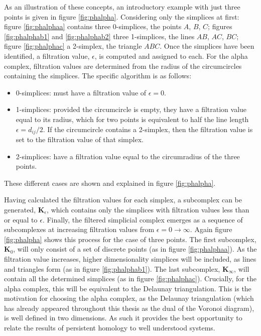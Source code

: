 As an illustration of these concepts, an introductory example with just three points is given in figure \ref{fig:phalpha}.
Considering only the simplices at first: figure \ref{fig:phalphaa} contains three 0\--simplices, the points $A$, $B$, $C$; figures \ref{fig:phalphab1} and \ref{fig:phalphab2} three 1\--simplices, the lines $AB$, $AC$, $BC$; figure \ref{fig:phalphac} a 2\--simplex, the triangle $ABC$.
Once the simplices have been identified, a filtration value, $\epsilon$, is computed and assigned to each.
For the alpha complex, filtration values are determined from the radius of the circumcircles containing the simplices.
The specific algorithm is as follows:
\begin{itemize}
	\item 0\--simplices: must have a filtration value of $\epsilon=0$.
	\item 1\--simplices: provided the circumcircle is empty, they have a filtration value equal to its radius, which for two points is equivalent to half the line length $\epsilon=d_{ij}/2$.
	If the circumcircle contains a 2\--simplex, then the filtration value is set to the filtration value of that simplex.
	\item 2\--simplices: have a filtration value equal to the circumradius of the three points.
\end{itemize}
These different cases are shown and explained in figure \ref{fig:phalpha}.

Having calculated the filtration values for each simplex, a subcomplex can be generated, $\mathbf{K}_\epsilon$, which contains only the simplices with filtration values less than or equal to $\epsilon$.
Finally, the filtered simplicial complex emerges as a sequence of subcomplexes at increasing filtration values from $\epsilon=0\rightarrow \infty$.
Again figure \ref{fig:phalpha} shows this process for the case of three points.
The first subcomplex, $\mathbf{K}_0$, will only consist of a set of discrete points (as in figure \ref{fig:phalphaa}).
As the filtration value increases, higher dimensionality simplices will be included, as lines and triangles form (as in figure \ref{fig:phalphab1}).
The last subcomplex, $\mathbf{K}_\infty$, will contain all the determined simplices (as in figure \ref{fig:phalphac}).
Crucially, for the alpha complex, this will be equivalent to the Delaunay triangulation.
This is the motivation for choosing the alpha complex, as the Delaunay triangulation (which has already appeared throughout this thesis as the dual of the Voronoi diagram), is well defined in two dimensions. 
As such it provides the best opportunity to relate the results of persistent homology to well understood systems.


